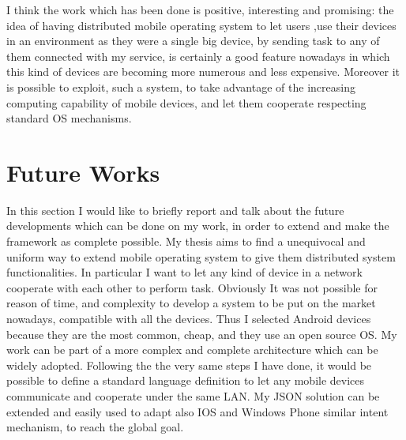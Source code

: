 I think the work which has been done is positive, interesting and promising: the
idea of having distributed mobile operating system to let users ,use their devices in an environment as they were a single big device, by sending task to any of them connected with my service, is certainly a good feature nowadays in which this kind of devices are becoming more numerous and less expensive. Moreover it is possible to exploit, such a system, to take advantage of the increasing computing capability of mobile devices, and let them cooperate respecting standard OS mechanisms.
\section{Future Works}
In this section I would like to briefly report and talk about the future developments which can be done on my work, in order to extend and make the framework as complete possible.
My thesis aims to find a unequivocal and uniform way to extend mobile operating system to give them distributed system functionalities. In particular I want to let any kind of device in a network cooperate with each other to perform task. Obviously It was not possible for
reason of time, and complexity to develop a system to be put on the market nowadays, compatible with all the devices. Thus I selected Android devices because they are the most common, cheap, and they use an open source OS. My work can be part of a more complex and complete architecture which can be widely adopted. Following the the very same steps I have done, it would be possible to define a standard language definition to let any mobile devices communicate and cooperate under the same LAN. My JSON solution can be extended and easily used to adapt also IOS and Windows Phone similar intent mechanism, to reach the global goal.




%

